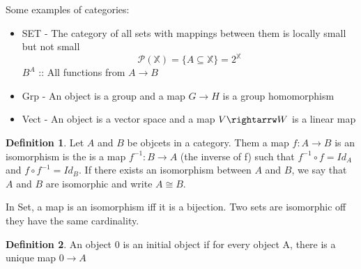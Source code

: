 \documentclass{article}
\theoremstyle{definition}
\newtheorem{definition}{Definition}
\theoremstyle{remark}
\begin{document}
Some examples of categories:
\begin{itemize}
\item SET - The category of all sets with mappings between them is locally small but not small
  $$ \mathcal{P}(\mathbb{X}) = \{A \subseteq \mathbb{X}\} = 2^{\mathbb{X}} $$
  $ B^A $ :: All functions from $A \rightarrow B $
\item Grp - An object is a group and a map $ G \rightarrow H $ is a group homomorphism
\item Vect - An object is a vector space and a map $ V \rightarrw W $ is a linear map
\end{itemize}

\begin{definition}
  Let $A$ and $B$ be objcets in a category. Them a map $f : A \rightarrow B$ is an
  isomorphism is the is a map $ f^{-1}  : B \rightarrow A $ (the inverse of f) such that
  $f^{-1} \circ f = Id_A $ and $f \circ f^{-1} = Id_B$. If there exists an isomorphism between $A$ and $B$,
  we say that $A$ and $B$ are isomorphic and write $A \cong B$.
\end{definition}

\begin{proposition}
  In Set, a map is an isomorphism iff it is a bijection. Two sets are isomorphic
  off they have the same cardinality.
\end{proposition}

\begin{definition}
  An object $0$ is an initial object if for every object A, there is a unique map $ 0 \rightarrow A $
\end{definition}
\end{document}
